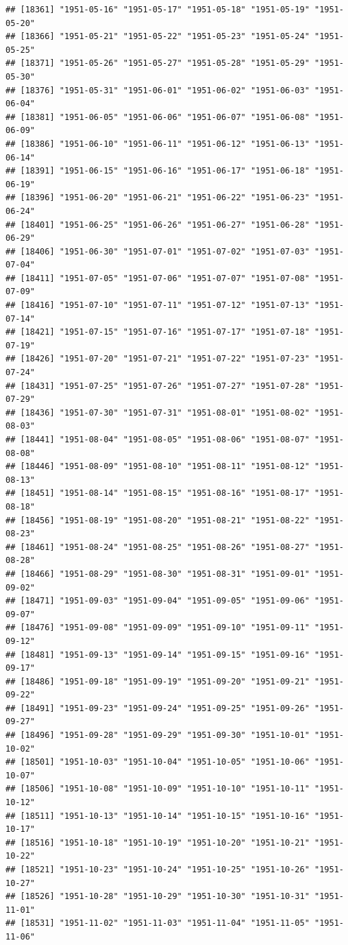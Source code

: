 \documentclass{article}\usepackage[]{graphicx}\usepackage[]{color}
\makeatletter
\newenvironment{kframe}{%
 \def\at@end@of@kframe{}%
 \ifinner\ifhmode%
  \def\at@end@of@kframe{\end{minipage}}%
  \begin{minipage}{\columnwidth}%
 \fi\fi%
 \def\FrameCommand##1{\hskip\@totalleftmargin \hskip-\fboxsep
 \colorbox{shadecolor}{##1}\hskip-\fboxsep
     \hskip-\linewidth \hskip-\@totalleftmargin \hskip\columnwidth}%
 \MakeFramed {\advance\hsize-\width
   \@totalleftmargin\z@ \linewidth\hsize
   \@setminipage}}%
 {\par\unskip\endMakeFramed%
 \at@end@of@kframe}
\newenvironment{knitrout}{}{} %
\makeatother
\begin{document}
\begin{description}
\begin{knitrout}
\begin{kframe}
\begin{verbatim}
## [18361] "1951-05-16" "1951-05-17" "1951-05-18" "1951-05-19" "1951-05-20"
## [18366] "1951-05-21" "1951-05-22" "1951-05-23" "1951-05-24" "1951-05-25"
## [18371] "1951-05-26" "1951-05-27" "1951-05-28" "1951-05-29" "1951-05-30"
## [18376] "1951-05-31" "1951-06-01" "1951-06-02" "1951-06-03" "1951-06-04"
## [18381] "1951-06-05" "1951-06-06" "1951-06-07" "1951-06-08" "1951-06-09"
## [18386] "1951-06-10" "1951-06-11" "1951-06-12" "1951-06-13" "1951-06-14"
## [18391] "1951-06-15" "1951-06-16" "1951-06-17" "1951-06-18" "1951-06-19"
## [18396] "1951-06-20" "1951-06-21" "1951-06-22" "1951-06-23" "1951-06-24"
## [18401] "1951-06-25" "1951-06-26" "1951-06-27" "1951-06-28" "1951-06-29"
## [18406] "1951-06-30" "1951-07-01" "1951-07-02" "1951-07-03" "1951-07-04"
## [18411] "1951-07-05" "1951-07-06" "1951-07-07" "1951-07-08" "1951-07-09"
## [18416] "1951-07-10" "1951-07-11" "1951-07-12" "1951-07-13" "1951-07-14"
## [18421] "1951-07-15" "1951-07-16" "1951-07-17" "1951-07-18" "1951-07-19"
## [18426] "1951-07-20" "1951-07-21" "1951-07-22" "1951-07-23" "1951-07-24"
## [18431] "1951-07-25" "1951-07-26" "1951-07-27" "1951-07-28" "1951-07-29"
## [18436] "1951-07-30" "1951-07-31" "1951-08-01" "1951-08-02" "1951-08-03"
## [18441] "1951-08-04" "1951-08-05" "1951-08-06" "1951-08-07" "1951-08-08"
## [18446] "1951-08-09" "1951-08-10" "1951-08-11" "1951-08-12" "1951-08-13"
## [18451] "1951-08-14" "1951-08-15" "1951-08-16" "1951-08-17" "1951-08-18"
## [18456] "1951-08-19" "1951-08-20" "1951-08-21" "1951-08-22" "1951-08-23"
## [18461] "1951-08-24" "1951-08-25" "1951-08-26" "1951-08-27" "1951-08-28"
## [18466] "1951-08-29" "1951-08-30" "1951-08-31" "1951-09-01" "1951-09-02"
## [18471] "1951-09-03" "1951-09-04" "1951-09-05" "1951-09-06" "1951-09-07"
## [18476] "1951-09-08" "1951-09-09" "1951-09-10" "1951-09-11" "1951-09-12"
## [18481] "1951-09-13" "1951-09-14" "1951-09-15" "1951-09-16" "1951-09-17"
## [18486] "1951-09-18" "1951-09-19" "1951-09-20" "1951-09-21" "1951-09-22"
## [18491] "1951-09-23" "1951-09-24" "1951-09-25" "1951-09-26" "1951-09-27"
## [18496] "1951-09-28" "1951-09-29" "1951-09-30" "1951-10-01" "1951-10-02"
## [18501] "1951-10-03" "1951-10-04" "1951-10-05" "1951-10-06" "1951-10-07"
## [18506] "1951-10-08" "1951-10-09" "1951-10-10" "1951-10-11" "1951-10-12"
## [18511] "1951-10-13" "1951-10-14" "1951-10-15" "1951-10-16" "1951-10-17"
## [18516] "1951-10-18" "1951-10-19" "1951-10-20" "1951-10-21" "1951-10-22"
## [18521] "1951-10-23" "1951-10-24" "1951-10-25" "1951-10-26" "1951-10-27"
## [18526] "1951-10-28" "1951-10-29" "1951-10-30" "1951-10-31" "1951-11-01"
## [18531] "1951-11-02" "1951-11-03" "1951-11-04" "1951-11-05" "1951-11-06"

\end{verbatim}
\end{kframe}
\end{knitrout}
\end{description}
\end{document}
